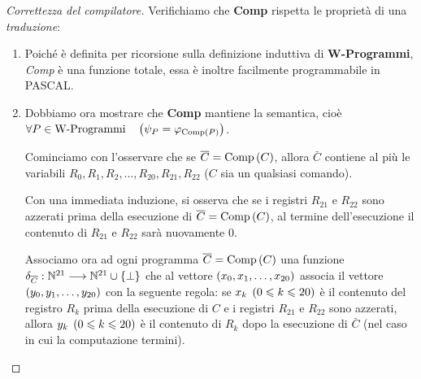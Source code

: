 \documentclass{lectures}
\begin{document}
\begin{proof}[Correttezza del compilatore]
    Verifichiamo che \textbf{Comp} rispetta le proprietà di una \textit{traduzione}:
    \begin{enumerate}
        \item Poiché è definita per ricorsione sulla definizione induttiva di \textbf{W-Programmi}, \textit{Comp} è una funzione totale, essa è inoltre facilmente programmabile in PASCAL.
        \item \begin{multicols}{2}
            Dobbiamo ora mostrare che \textbf{Comp} mantiene la semantica, cioè \(\forall P \in \text{W-Programmi}\quad\left(\psi_P = \varphi_{\text{Comp}\left(P\right)}\right)\).
            
            Cominciamo con l'osservare che se \(\overline{C} = \text{Comp}\left(C\right)\), allora \(\bar{C}\) contiene al più le variabili \(R_0, R_1, R_2, \ldots, R_{20}, R_{21}, R_{22}\) (\(C\) sia un qualsiasi comando).
            
            Con una immediata induzione, si osserva che se i registri \(R_{21}\) e \(R_{22}\) sono azzerati prima della esecuzione di \(\overline{C}=\text{Comp}\left(C\right)\), al termine dell'esecuzione il contenuto di \(R_{21}\) e \(R_{22}\) sarà nuovamente 0.
            
            Associamo ora ad ogni programma \(\overline{C} = \text{Comp}\left(C\right)\) una funzione \(
                \delta_{\overline{C}}:\mathbb{N}^{21}\longrightarrow \mathbb{N}^{21}\cup\left\{\bot\right\}
            \) che al vettore \(\left(x_0, x_1, \ldots, x_{20}\right)\) associa il vettore \(\left(y_0, y_1, \ldots, y_{20}\right)\) con la seguente regola: se \(x_k\;\left(0\leqslant k \leqslant 20\right)\) è il contenuto del registro \(R_k\) prima della esecuzione di \(C\) e i registri \(R_{21}\) e \(R_{22}\) sono azzerati, allora \(y_k\;\left(0\leqslant k \leqslant 20\right)\) è il contenuto di \(R_k\) dopo la esecuzione di \(\bar{C}\) (nel caso in cui la computazione termini).
            

\end{multicols}
\end{enumerate}
\end{proof}
\end{document}
